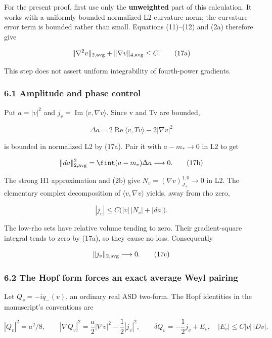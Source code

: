 For the present proof, first use only the \textbf{unweighted} part of
this calculation. It works with a uniformly bounded normalized L2
curvature norm; the curvature-error term is bounded rather than small.
Equations (11)--(12) and (2a) therefore give

\[
 \|\nabla^2v\|_{2,\rm avg}+\|\nabla v\|_{4,\rm avg}\le C.
\tag{17a}
\]

This step does not assert uniform integrability of fourth-power
gradients.

\hypertarget{o10strength:amplitude-and-phase-control}{%
\subsubsection{6.1 Amplitude and phase
control}\label{o10strength:amplitude-and-phase-control}}

Put \(a=|v|^2\) and \(j_v=\operatorname{Im}\langle v,\nabla v\rangle\).
Since v and Tv are bounded,

\[
 \Delta a=2\operatorname{Re}\langle v,Tv\rangle-2|\nabla v|^2
\]

is bounded in normalized L2 by (17a). Pair it with \(a-m_*\to0\) in L2
to get

\[
 \|da\|_{2,\rm avg}^2
 =\fint(a-m_*)\Delta a\longrightarrow0.
\tag{17b}
\]

The strong H1 approximation and (2b) give
\(N_v=(\nabla v)^{1,0}_{J_+}\to0\) in L2. The elementary complex
decomposition of \(\langle v,\nabla v\rangle\) yields, away from rho
zero,

\[
 |j_v|\le C\bigl(|v|\,|N_v|+|da|\bigr).
\]

The low-rho sets have relative volume tending to zero. Their
gradient-square integral tends to zero by (17a), so they cause no loss.
Consequently

\[
 \|j_v\|_{2,\rm avg}\longrightarrow0.
\tag{17c}
\]

\hypertarget{o10strength:the-hopf-form-forces-an-exact-average-weyl-pairing}{%
\subsubsection{6.2 The Hopf form forces an exact average Weyl
pairing}\label{o10strength:the-hopf-form-forces-an-exact-average-weyl-pairing}}

Let \(Q_v=-iq_-(v)\), an ordinary real ASD two-form. The Hopf identities
in the manuscript's conventions are

\[
 |Q_v|^2=a^2/8,\qquad
 |\nabla Q_v|^2=\frac a2|\nabla v|^2-\frac12|j_v|^2,
 \qquad
 \delta Q_v=-\frac12j_v+E_v,
 \quad |E_v|\le C|v|\,|Dv|.
\tag{17d}
\]

